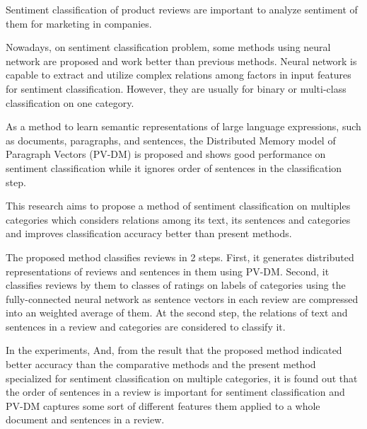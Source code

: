 Sentiment classification of product reviews are important
to analyze sentiment of them for marketing in companies.

Nowadays, on sentiment classification problem,
some methods using neural network are proposed
and work better than previous methods.
Neural network is capable to extract and utilize complex relations
among factors in input features for sentiment classification.
However, they are usually for binary or multi-class classification
on one category.

As a method to learn semantic representations of large language expressions,
such as documents, paragraphs, and sentences,
the Distributed  Memory model of Paragraph Vectors (PV-DM) is proposed
and shows good performance on sentiment classification
while it ignores order of sentences in the classification step.

This research aims to propose a method of sentiment classification
on multiples categories
which considers relations among its text, its sentences and categories
and improves classification accuracy better than present methods.

The proposed method classifies reviews in 2 steps.
First, it generates distributed representations of reviews and sentences
in them using PV-DM.
Second, it classifies reviews by them to classes of ratings
on labels of categories using the fully-connected neural network
as sentence vectors in each review are compressed
into an weighted average of them.
At the second step, the relations of text and sentences in a review
and categories are considered to classify it.

In the experiments,
And, from the result that the proposed method indicated better accuracy
than the comparative methods and the present method specialized
for sentiment classification on multiple categories,
it is found out that
the order of sentences in a review is important for sentiment classification
and PV-DM captures some sort of different features them
applied to a whole document and sentences in a review.

